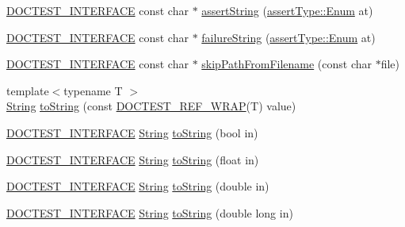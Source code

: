 \begin{DoxyCompactItemize}
\item 
\mbox{\hyperlink{doctest_8h_a9c16ffc635ec47f07797d21ede26b1a5}{D\+O\+C\+T\+E\+S\+T\+\_\+\+I\+N\+T\+E\+R\+F\+A\+CE}} const char $\ast$ \mbox{\hyperlink{namespacedoctest_aa51be8558a5ec9675a77d2ecbc08e663}{assert\+String}} (\mbox{\hyperlink{namespacedoctest_1_1assert_type_ae1bb5bed722f34f1c38b83cb19d326d3}{assert\+Type\+::\+Enum}} at)
\item 
\mbox{\hyperlink{doctest_8h_a9c16ffc635ec47f07797d21ede26b1a5}{D\+O\+C\+T\+E\+S\+T\+\_\+\+I\+N\+T\+E\+R\+F\+A\+CE}} const char $\ast$ \mbox{\hyperlink{namespacedoctest_a9d2d487c802fb0e66172a0ed2c9f76db}{failure\+String}} (\mbox{\hyperlink{namespacedoctest_1_1assert_type_ae1bb5bed722f34f1c38b83cb19d326d3}{assert\+Type\+::\+Enum}} at)
\item 
\mbox{\hyperlink{doctest_8h_a9c16ffc635ec47f07797d21ede26b1a5}{D\+O\+C\+T\+E\+S\+T\+\_\+\+I\+N\+T\+E\+R\+F\+A\+CE}} const char $\ast$ \mbox{\hyperlink{namespacedoctest_adb4ee7dd3659dcc165944d73f6e29199}{skip\+Path\+From\+Filename}} (const char $\ast$file)
\item 
{\footnotesize template$<$typename T $>$ }\\\mbox{\hyperlink{classdoctest_1_1_string}{String}} \mbox{\hyperlink{namespacedoctest_a8907bf35788959391343a2304f004e17}{to\+String}} (const \mbox{\hyperlink{doctest_8h_af2901cafb023c57fb672ccb1bf14f2eb}{D\+O\+C\+T\+E\+S\+T\+\_\+\+R\+E\+F\+\_\+\+W\+R\+AP}}(T) value)
\item 
\mbox{\hyperlink{doctest_8h_a9c16ffc635ec47f07797d21ede26b1a5}{D\+O\+C\+T\+E\+S\+T\+\_\+\+I\+N\+T\+E\+R\+F\+A\+CE}} \mbox{\hyperlink{classdoctest_1_1_string}{String}} \mbox{\hyperlink{namespacedoctest_a70fd23e88074d38b9d61476005305df5}{to\+String}} (bool in)
\item 
\mbox{\hyperlink{doctest_8h_a9c16ffc635ec47f07797d21ede26b1a5}{D\+O\+C\+T\+E\+S\+T\+\_\+\+I\+N\+T\+E\+R\+F\+A\+CE}} \mbox{\hyperlink{classdoctest_1_1_string}{String}} \mbox{\hyperlink{namespacedoctest_a68660ce630bd88a551ab3108709e6592}{to\+String}} (float in)
\item 
\mbox{\hyperlink{doctest_8h_a9c16ffc635ec47f07797d21ede26b1a5}{D\+O\+C\+T\+E\+S\+T\+\_\+\+I\+N\+T\+E\+R\+F\+A\+CE}} \mbox{\hyperlink{classdoctest_1_1_string}{String}} \mbox{\hyperlink{namespacedoctest_a43b51978c9505f682cbff9462a02f8af}{to\+String}} (double in)
\item 
\mbox{\hyperlink{doctest_8h_a9c16ffc635ec47f07797d21ede26b1a5}{D\+O\+C\+T\+E\+S\+T\+\_\+\+I\+N\+T\+E\+R\+F\+A\+CE}} \mbox{\hyperlink{classdoctest_1_1_string}{String}} \mbox{\hyperlink{namespacedoctest_ae4e12dd9865bb31f417f9df0c41813cf}{to\+String}} (double long in)

\end{DoxyCompactItemize}
